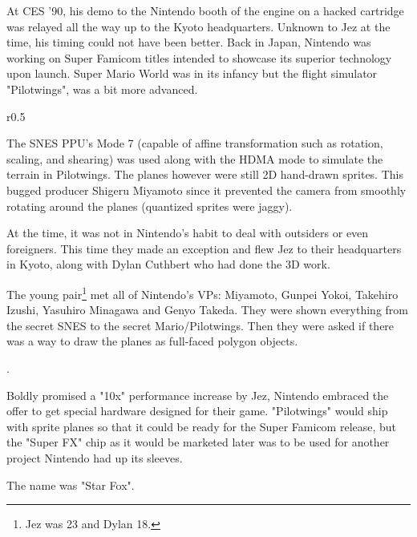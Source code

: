 At CES '90, his demo to the Nintendo booth of the engine on a hacked cartridge was relayed all the way up to the Kyoto headquarters. Unknown to Jez at the time, his timing could not have been better. Back in Japan, Nintendo was working on Super Famicom titles intended to showcase its superior technology upon launch. Super Mario World was in its infancy but the flight simulator "Pilotwings", was a bit more advanced.\\ 
\par
\begin{wrapfigure}[14]{r}{0.5\textwidth}{
\centering {}}
\end{wrapfigure}
The SNES PPU's Mode 7 (capable of affine transformation such as rotation, scaling, and shearing) was used along with the HDMA mode to simulate the terrain in Pilotwings. The planes however were still 2D hand-drawn sprites. This bugged producer Shigeru Miyamoto since it prevented the camera from smoothly rotating around the planes (quantized sprites were jaggy).\\ \par
At the time, it was not in Nintendo's habit to deal with outsiders or even foreigners. This time they made an exception and flew Jez to their headquarters in Kyoto, along with Dylan Cuthbert who had done the 3D work.\\
\par
 The young pair\footnote{Jez was 23 and Dylan 18.} met all of Nintendo's VPs: Miyamoto, Gunpei Yokoi, Takehiro Izushi, Yasuhiro Minagawa and Genyo Takeda. They were shown everything from the secret SNES to the secret Mario/Pilotwings. Then they were asked if there was a way to draw the planes as full-faced polygon objects.\\
\par
{}.\\
\par

Boldly promised a "10x" performance increase by Jez, Nintendo embraced the offer to get special hardware designed for their game. "Pilotwings" would ship with sprite planes so that it could be ready for the Super Famicom release, but the "Super FX" chip as it would be marketed later was to be used for another project Nintendo had up its sleeves.\\
\par
The name was "Star Fox".

